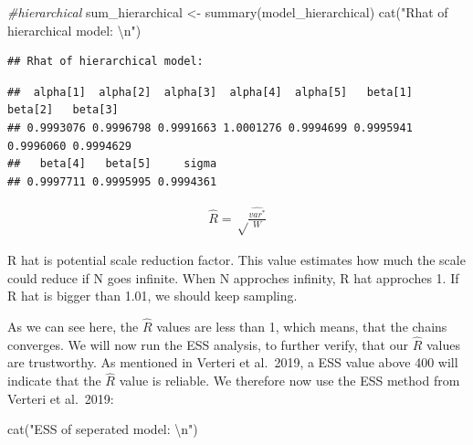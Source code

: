 \documentclass[
]{article}
\newenvironment{Shaded}{\begin{snugshade}}{\end{snugshade}}
\newcommand{\CommentTok}[1]{\textcolor[rgb]{0.56,0.35,0.01}{\textit{#1}}}
\newcommand{\DecValTok}[1]{\textcolor[rgb]{0.00,0.00,0.81}{#1}}
\newcommand{\FunctionTok}[1]{\textcolor[rgb]{0.00,0.00,0.00}{#1}}
\newcommand{\NormalTok}[1]{#1}
\newcommand{\OtherTok}[1]{\textcolor[rgb]{0.56,0.35,0.01}{#1}}
\newcommand{\SpecialCharTok}[1]{\textcolor[rgb]{0.00,0.00,0.00}{#1}}
\newcommand{\StringTok}[1]{\textcolor[rgb]{0.31,0.60,0.02}{#1}}
\begin{document}
\begin{Shaded}
\begin{Highlighting}[]
\CommentTok{\#hierarchical}
\NormalTok{sum\_hierarchical }\OtherTok{\textless{}{-}} \FunctionTok{summary}\NormalTok{(model\_hierarchical)}
\FunctionTok{cat}\NormalTok{(}\StringTok{"Rhat of hierarchical model: }\SpecialCharTok{\textbackslash{}n}\StringTok{"}\NormalTok{)}
\end{Highlighting}
\end{Shaded}

\begin{verbatim}
## Rhat of hierarchical model:
\end{verbatim}

\begin{Shaded}
\end{Shaded}

\begin{verbatim}
##  alpha[1]  alpha[2]  alpha[3]  alpha[4]  alpha[5]   beta[1]   beta[2]   beta[3] 
## 0.9993076 0.9996798 0.9991663 1.0001276 0.9994699 0.9995941 0.9996060 0.9994629 
##   beta[4]   beta[5]     sigma 
## 0.9997711 0.9995995 0.9994361
\end{verbatim}

\[
\begin{aligned}
\hat{R} = \sqrt\frac{\hat{var^*}}{W}
\end{aligned}
\]

R hat is potential scale reduction factor. This value estimates how much
the scale could reduce if N goes infinite. When N approches infinity, R
hat approches 1. If R hat is bigger than 1.01, we should keep sampling.

As we can see here, the \(\hat{R}\) values are less than 1, which means,
that the chains converges. We will now run the ESS analysis, to further
verify, that our \(\hat{R}\) values are trustworthy. As mentioned in
Verteri et al.~2019, a ESS value above 400 will indicate that the
\(\hat{R}\) value is reliable. We therefore now use the ESS method from
Verteri et al.~2019:

\begin{Shaded}
\begin{Highlighting}[]
\FunctionTok{cat}\NormalTok{(}\StringTok{"ESS of seperated model: }\SpecialCharTok{\textbackslash{}n}\StringTok{"}\NormalTok{)}
\end{Highlighting}
\end{Shaded}
\end{document}
